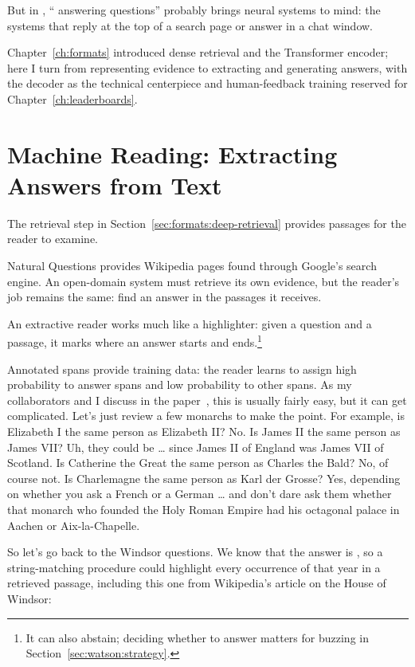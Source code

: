 
 But in \currentyear{},
`` answering questions'' probably brings neural systems to
mind: the systems that reply at the top of a search page or answer in
a chat window.

Chapter~\ref{ch:formats} introduced dense retrieval and the Transformer encoder; here I turn from representing evidence to extracting and generating answers, with the decoder as the technical centerpiece and human-feedback training reserved for Chapter~\ref{ch:leaderboards}.

\section{Machine Reading: Extracting Answers from Text}
\label{sec:methods:reading}

The retrieval step in Section~\ref{sec:formats:deep-retrieval} provides passages for the reader to examine.

Natural Questions provides Wikipedia pages found through Google's search engine.  An open-domain system must retrieve its own evidence, but the reader's job remains the same: find an answer in the passages it receives.

An extractive reader works much like a highlighter: given a question and a passage, it marks where an answer starts and ends.\footnote{It can also abstain; deciding whether to answer matters for buzzing in Section~\ref{sec:watson:strategy}.}


Annotated spans provide training data: the reader learns to assign high probability to answer spans and low probability to other spans.  As my collaborators and I discuss in the  paper~\citep{li-etal-2024-pedants}, this is usually fairly easy, but it can get complicated.  Let's just review a few monarchs to make the point.  For example, is Elizabeth I the same person as Elizabeth II?  No.  Is James II the same person as James VII?  Uh, they could be \dots{} since James II of England was James VII of Scotland.    Is Catherine the Great the same person as Charles the Bald?  No, of course not.  Is Charlemagne the same person as Karl der Grosse?  Yes, depending on whether you ask a French or a German \dots{} and don't dare ask them whether that monarch who founded the Holy Roman Empire had his octagonal palace in Aachen or Aix-la-Chapelle.

So let's go back to the Windsor questions.  We know that the answer is , so a string-matching procedure could highlight every occurrence of that year in a retrieved passage, including this one from Wikipedia's article on the House of Windsor:

